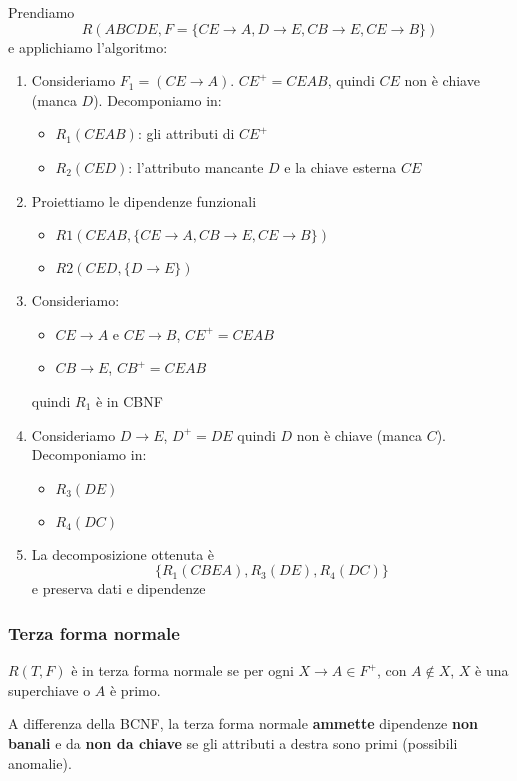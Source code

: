 \begin{example}
	Prendiamo
	\begin{equation*}
		R(ABCDE, F=\{CE \to A, D \to E, CB \to E, CE \to B\})
	\end{equation*}
	e applichiamo l'algoritmo:
	\begin{enumerate}
		\item Consideriamo $F_1 = (CE \to A)$. $CE^+ = CEAB$, quindi $CE$ non è chiave (manca $D$). Decomponiamo in:
		\begin{itemize}
			\item $R_1(CEAB)$: gli attributi di $CE^+$
			\item $R_2(CED)$: l'attributo mancante $D$ e la chiave esterna $CE$
		\end{itemize}
		\item Proiettiamo le dipendenze funzionali
		\begin{itemize}
			\item $R1(CEAB, \{CE \to A, CB \to E, CE \to B\})$
			\item $R2(CED, \{D \to E\})$
		\end{itemize}
		\item Consideriamo:
		\begin{itemize}
			\item $CE \to A$ e $CE \to B$, $CE^+=CEAB$
			\item $CB \to E$, $CB^+ = CEAB$
		\end{itemize}
		quindi $R_1$ è in CBNF
		\item Consideriamo $D \to E$, $D^+ = DE$ quindi $D$ non è chiave (manca $C$). Decomponiamo in:
		\begin{itemize}
			\item $R_3(DE)$
			\item $R_4(DC)$
		\end{itemize}
		\item La decomposizione ottenuta è
		\begin{equation*}
			\{R_1(CBEA), R_3(DE), R_4(DC)\}
		\end{equation*}
		e preserva dati e dipendenze
	\end{enumerate}
\end{example}
\newpage
\subsubsection{Terza forma normale}
\begin{definition}
	$R(T, F)$ è in terza forma normale se per ogni $X \to A \in F^+$, con $A \notin X$, $X$ è una superchiave o $A$ è primo.
\end{definition}
 A differenza della BCNF, la terza forma normale \textbf{ammette} dipendenze \textbf{non banali} e da \textbf{non da chiave} se gli attributi a destra sono primi (possibili anomalie).
 
